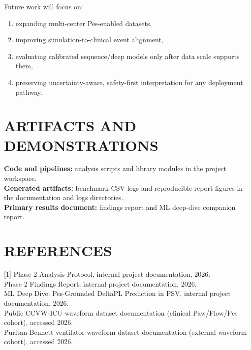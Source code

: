 \documentclass[9pt,twocolumn]{article}
\begin{document}
Future work will focus on:
\begin{enumerate}[leftmargin=14pt]
\item expanding multi-center Pes-enabled datasets,
\item improving simulation-to-clinical event alignment,
\item evaluating calibrated sequence/deep models only after data scale supports them,
\item preserving uncertainty-aware, safety-first interpretation for any deployment pathway.
\end{enumerate}

\section{ARTIFACTS AND DEMONSTRATIONS}

\textbf{Code and pipelines:} analysis scripts and library modules in the project workspace.\\
\textbf{Generated artifacts:} benchmark CSV logs and reproducible report figures in the documentation and logs directories.\\
\textbf{Primary results document:} findings report and ML deep-dive companion report.

\section{REFERENCES}

[1] Phase 2 Analysis Protocol, internal project documentation, 2026.\\
[2] Phase 2 Findings Report, internal project documentation, 2026.\\
[3] ML Deep Dive: Pes-Grounded DeltaPL Prediction in PSV, internal project documentation, 2026.\\
[4] Public CCVW-ICU waveform dataset documentation (clinical Paw/Flow/Pes cohort), accessed 2026.\\
[5] Puritan-Bennett ventilator waveform dataset documentation (external waveform cohort), accessed 2026.
\end{document}
